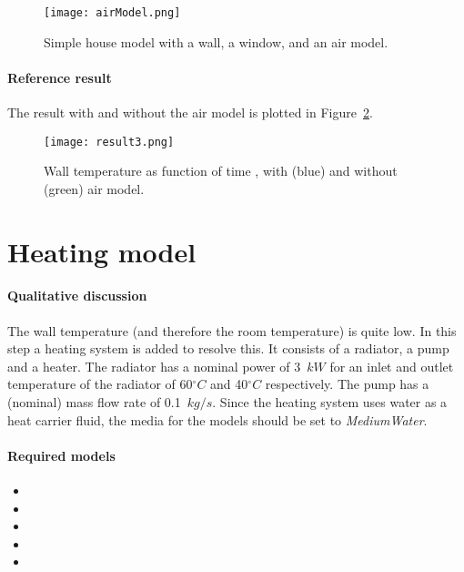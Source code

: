 \documentclass[10pt,a4paper]{article}
\begin{document}
\begin{figure}[h!]
\centering
\texttt{[image: airModel.png]}
\caption{Simple house model with a wall, a window, and an air model.}
\label{fig:airModel}
\end{figure} 

\paragraph{Reference result}
The result with and without the air model
is plotted in Figure~\ref{fig:res3}.


\begin{figure}[h!]
\centering
\texttt{[image: result3.png]}
\caption{Wall temperature as function of time ,
with (blue) and without (green) air model.}
\label{fig:res3}
\end{figure}

\newpage

\section{Heating model}
\paragraph{Qualitative discussion}
The wall temperature (and therefore the room temperature) is quite low. 
In this step a heating system is added to resolve this.
It consists of a radiator, a pump and a heater.
The radiator has a nominal power of 3~$kW$ for an inlet and outlet temperature of the radiator of 60$^{\circ}C$ and 40$^{\circ}C$ respectively.
The pump has a (nominal) mass flow rate of 0.1~$kg/s$.
Since the heating system uses water as a heat carrier fluid, 
the media for the models should be set to \textit{MediumWater}.

\paragraph{Required models}
\begin{itemize}
\item {}
\item {}
\item {}
\item {}
\item {}
\end{itemize}
\end{document}
